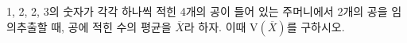 1, 2, 2, 3의 숫자가 각각 하나씩 적힌 4개의 공이 들어 있는 주머니에서 2개의 공을 임의추출할 때, 공에 적힌 수의 평균을 $\overline{X}$라 하자. 이때 $\mathrm{V}(\overline{X})$를 구하시오.
